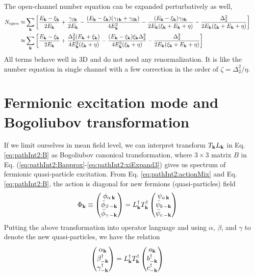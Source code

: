 The open-channel number equation  can be expanded perturbatively as well, \begin{equation}
\begin{split}
N_{open}\approx&\sum_{\mathbf{k}}\left[\frac{E_{\mathbf{k}}-\xi_{\mathbf{k}}}{2E_{\mathbf{k}}}+\frac{\gamma_{1\mathbf{k}}}{2E_{\mathbf{k}}}
	-\frac{(E_{\mathbf{k}}-\xi_{\mathbf{k}})(\gamma_{1\mathbf{k}}+\gamma_{2\mathbf{k}})}{4E_{\mathbf{k}}^2}
	-\frac{(E_{\mathbf{k}}-\xi_{\mathbf{k}})\gamma_{3\mathbf{k}}}{2E_{\mathbf{k}}(\xi_{\mathbf{k}}+E_{\mathbf{k}}+\eta)}
	-\frac{\Delta_{2}^{2}}{2E_{\mathbf{k}}(\xi_{\mathbf{k}}+E_{\mathbf{k}}+\eta)}\right]\\
	\approx&\sum_{\mathbf{k}}\left[\frac{E_{\mathbf{k}}-\xi_{\mathbf{k}}}{2E_{\mathbf{k}}}+\frac{{\Delta_{2}^{2}(E_{\mathbf{k}}+\xi_{\mathbf{k}})}}{4E_{\mathbf{k}}^{2}(\xi_{\mathbf{k}}+\eta)}
	-\frac{(E_{\mathbf{k}}-\xi_{\mathbf{k}})\xi_{\mathbf{k}}\Delta_{2}^{2}}{4E_{\mathbf{k}}^3(\xi_{\mathbf{k}}+\eta)}
	-\frac{\Delta_{2}^{2}}{2E_{\mathbf{k}}(\xi_{\mathbf{k}}+E_{\mathbf{k}}+\eta)}\right]	
\end{split}
\end{equation}
All terms behave well  in 3D and do not need any renormalization.   It is like the number equation in single channel with  a few correction in the order of $\zeta=\Delta_2^2/\eta$.  

%

\section{Fermionic excitation mode and Bogoliubov transformation\label{sec:pathInt2:bog}}
If we limit ourselves in mean field level, we can interpret transform $T_{\mathbf{k}}{}L_{\mathbf{k}}$ in Eq. \eqref{eq:pathInt2:B} as Bogoliubov canonical transformation, where  $3\times3$ matrix $B$ in Eq. (\ref{eq:pathInt2:Bapprox}-\ref{eq:pathInt2:xiExpand3}) gives us spectrum of fermionic quasi-particle excitation. From Eq. \eqref{eq:pathInt2:actionMix} and Eq. \eqref{eq:pathInt2:B}, the action is diagonal for new fermions (quasi-particles) field 
\begin{equation*}
\Phi_{\mathbf{k}}\equiv\begin{pmatrix}\phi_{\alpha\,\mathbf{k}}\\\bar\phi_{\beta\,-\mathbf{k}}\\\bar\phi_{\gamma\,-\mathbf{k}}\end{pmatrix}
=L^{\dagger}_{\mathbf{k}}T^{\dagger}_{\mathbf{k}}\begin{pmatrix}\psi_{a\,\mathbf{k}}\\\bar\psi_{b\,-\mathbf{k}}\\\bar\psi_{c\,-\mathbf{k}}\end{pmatrix}
\end{equation*}
Putting the above transformation into operator language and using $\alpha$, $\beta$, and $\gamma$ to denote the new quasi-particles,  we have the relation
\begin{equation}
\begin{pmatrix}\alpha_{\mathbf{k}}\\\beta_{-\mathbf{k}}^{\dagger}\\\gamma_{-\mathbf{k}}^{\dagger}\end{pmatrix}
=L^{\dagger}_{\mathbf{k}}T^{\dagger}_{\mathbf{k}}  \begin{pmatrix}a_{\mathbf{k}}\\b_{-\mathbf{k}}^{\dagger}\\c_{-\mathbf{k}}^{\dagger}\end{pmatrix}
\end{equation}   

